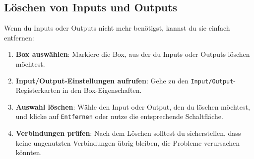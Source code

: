 \subsection{Löschen von Inputs und Outputs}
Wenn du Inputs oder Outputs nicht mehr benötigst, kannst du sie einfach entfernen:
\begin{enumerate}
    \item \textbf{Box auswählen}: Markiere die Box, aus der du Inputs oder Outputs löschen möchtest.
    \item \textbf{Input/Output-Einstellungen aufrufen}: Gehe zu den \texttt{Input/Output}-Registerkarten in den Box-Eigenschaften.
    \item \textbf{Auswahl löschen}: Wähle den Input oder Output, den du löschen möchtest, und klicke auf \texttt{Entfernen} oder nutze die entsprechende Schaltfläche.
    \item \textbf{Verbindungen prüfen}: Nach dem Löschen solltest du sicherstellen, dass keine ungenutzten Verbindungen übrig bleiben, die Probleme verursachen könnten.
\end{enumerate}

